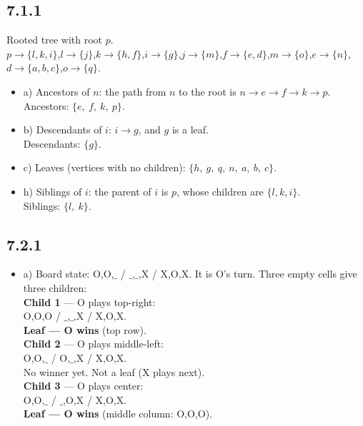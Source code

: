 \documentclass{article}
\begin{document}
\subsection*{7.1.1}
Rooted tree with root $p$.\\
$p \to \{l,k,i\}$,\quad $l \to \{j\}$,\quad $k \to \{h,f\}$,\quad $i \to \{g\}$,\quad $j \to \{m\}$,\quad $f \to \{e,d\}$,\quad $m \to \{o\}$,\quad $e \to \{n\}$,\quad $d \to \{a,b,c\}$,\quad $o \to \{q\}$.
\begin{itemize}
    \item a) Ancestors of $n$: the path from $n$ to the root is $n \to e \to f \to k \to p$.\\
    Ancestors: $\{e,\ f,\ k,\ p\}$.

    \item b) Descendants of $i$: $i \to g$, and $g$ is a leaf.\\
    Descendants: $\{g\}$.

    \item c) Leaves (vertices with no children): $\{h,\ g,\ q,\ n,\ a,\ b,\ c\}$.

    \item h) Siblings of $i$: the parent of $i$ is $p$, whose children are $\{l,k,i\}$.\\
    Siblings: $\{l,\ k\}$.
\end{itemize}

\subsection*{7.2.1}
\begin{itemize}
    \item a) Board state: O,O,$\_$ / $\_$,$\_$,X / X,O,X. It is O's turn. Three empty cells give three children:\\[4pt]
    \textbf{Child 1} --- O plays top-right:\\
    O,O,O / $\_$,$\_$,X / X,O,X.\\
    \textbf{Leaf --- O wins} (top row).\\[4pt]
    \textbf{Child 2} --- O plays middle-left:\\
    O,O,$\_$ / O,$\_$,X / X,O,X.\\
    No winner yet. Not a leaf (X plays next).\\[4pt]
    \textbf{Child 3} --- O plays center:\\
    O,O,$\_$ / $\_$,O,X / X,O,X.\\
    \textbf{Leaf --- O wins} (middle column: O,O,O).
\end{itemize}
\end{document}
